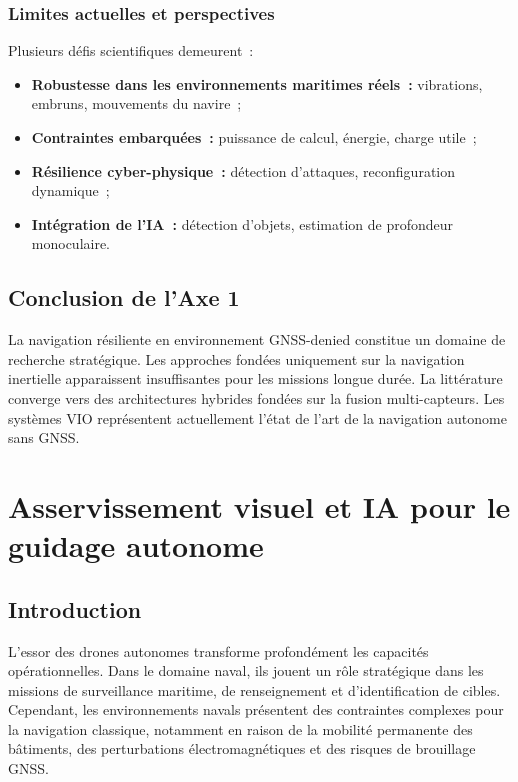 \documentclass[12pt, a4paper, twoside, openright]{report}
\begin{document}
\subsection{Limites actuelles et perspectives}

Plusieurs défis scientifiques demeurent~:

\begin{itemize}
    \item \textbf{Robustesse dans les environnements maritimes réels~:} vibrations, embruns, mouvements du navire~;
    \item \textbf{Contraintes embarquées~:} puissance de calcul, énergie, charge utile~;
    \item \textbf{Résilience cyber-physique~:} détection d'attaques, reconfiguration dynamique~;
    \item \textbf{Intégration de l'IA~:} détection d'objets, estimation de profondeur monoculaire.
\end{itemize}

\section{Conclusion de l'Axe 1}

La navigation résiliente en environnement GNSS-denied constitue un domaine de recherche stratégique. Les approches fondées uniquement sur la navigation inertielle apparaissent insuffisantes pour les missions longue durée. La littérature converge vers des architectures hybrides fondées sur la fusion multi-capteurs. Les systèmes VIO représentent actuellement l'état de l'art de la navigation autonome sans GNSS.

\cleardoublepage

\chapter{Asservissement visuel et IA pour le guidage autonome}\label{chap:axe2}

\section{Introduction}

L'essor des drones autonomes transforme profondément les capacités opérationnelles. Dans le domaine naval, ils jouent un rôle stratégique dans les missions de surveillance maritime, de renseignement et d'identification de cibles. Cependant, les environnements navals présentent des contraintes complexes pour la navigation classique, notamment en raison de la mobilité permanente des bâtiments, des perturbations électromagnétiques et des risques de brouillage GNSS.
\end{document}
